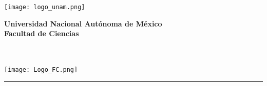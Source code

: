 
\begin{center}
    \begin{minipage}{3cm}
        \begin{center}
            \texttt{[image: logo\_unam.png]}
        \end{center}
    \end{minipage}\hfill
    \begin{minipage}{10cm}
        \begin{center}
            \textbf{\large Universidad Nacional Autónoma de México}\\[0.1cm]
            \textbf{Facultad de Ciencias}\\[0.1cm]
            \textbf{\materia}\\[0.1cm]
            \autor\\[0.1cm]
            \fecha{}
        \end{center}
    \end{minipage}\hfill
    \begin{minipage}{3cm}
        \begin{center}
            \texttt{[image: Logo\_FC.png]}
        \end{center}
    \end{minipage}
\end{center}

\noindent\rule{\textwidth}{0.01cm}\\

\begin{center}
    {\huge \tarea}
\end{center}
